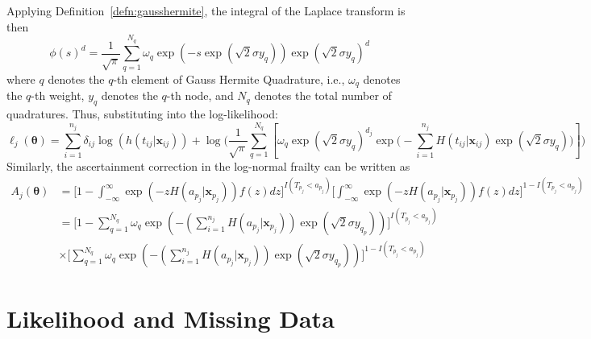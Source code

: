 \documentclass[preprint,12pt]{elsarticle}
\begin{document}
\noindent
Applying Definition~\ref{defn:gausshermite}, the integral of the Laplace transform is then
\begin{equation}
    \phi(s)^d=\frac{1}{\sqrt{\pi}}\sum_{q=1}^{N_{q}}\omega_{q}\exp(-s\exp(\sqrt{2}\sigma y_{q}))\exp(\sqrt{2}\sigma y_{q})^d
\end{equation}
where $q$ denotes the $q$-th element of Gauss Hermite Quadrature, i.e., $\omega_{q}$ denotes the $q$-th weight, $y_{q}$ denotes the $q$-th node, and $N_{q}$ denotes the total number of quadratures. Thus, substituting into the log-likelihood:
\begin{equation}
    \ell_j(\boldsymbol{\theta})=\sum_{i=1}^{n_j}\delta_{ij}\log(h(t_{ij}|\mathbf{x}_{ij}))+\log\Big (\frac{1}{\sqrt{\pi}}\sum_{q=1}^{N_{q}}\left [\omega_{q}\exp(\sqrt{2}\sigma y_{q})^{d_j}\exp\Big (-\sum_{i=1}^{n_j}H(t_{ij}|\mathbf{x}_{ij})\exp(\sqrt{2}\sigma y_{q})\Big )\right ]\Big )
\end{equation}
Similarly, the ascertainment correction in the log-normal frailty can be written as 
\begin{align}
    A_j(\boldsymbol{\theta})&=\Big [1-\int_{-\infty}^{\infty} \exp(-z H(a_{p_j}|\mathbf{x}_{p_j}))f(z)dz\Big ]^{I(T_{p_j}<a_{p_j})}\Big [ \int_{-\infty}^{\infty} \exp(-z H(a_{p_j}|\mathbf{x}_{p_j}))f(z)dz\Big ]^{1-I(T_{p_j}<a_{p_j})}\\
    &=\Big [1-\sum_{q=1}^{N_{q}}\omega_{q} \exp\left (-(\sum_{i=1}^{n_j} H(a_{p_j}|\mathbf{x}_{p_j}))\exp (\sqrt{2}\sigma y_{q_p})\right )\Big ]^{I(T_{p_j}<a_{p_j})}\\
    &\times \Big [ \sum_{q=1}^{N_{q}}\omega_{q} \exp\left (-(\sum_{i=1}^{n_j} H(a_{p_j}|\mathbf{x}_{p_j}))\exp (\sqrt{2}\sigma y_{q_p}) \right ) \Big ]^{1-I(T_{p_j}<a_{p_j})}
\end{align}

\section{Likelihood and Missing Data}\label{sec:likeandmissing}
\end{document}
